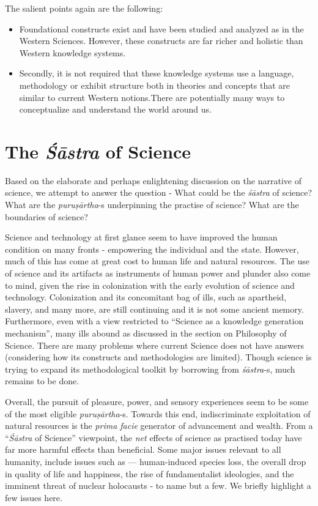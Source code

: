 The salient points again are the following:
\begin{itemize}[topsep=0pt]
\itemsep=0pt
\item Foundational constructs exist and have been studied and analyzed as in the Western Sciences. However, these constructs are far richer and holistic than Western knowledge systems.

 \item Secondly, it is not required that these knowledge systems use a language, methodology or exhibit structure both in theories and concepts that are similar to current Western notions.There are potentially many ways to conceptualize and understand the world around us.
\end{itemize}

\section*{The \textit{Śāstra} of Science}

Based on the elaborate and perhaps enlightening discussion on the narrative of science, we attempt to answer the question - What could be the \textit{śāstra} of science? What are the \textit{puruṣārtha}-s underpinning the practise of science? What are the boundaries of science?

Science and technology at first glance seem to have improved the human condition on many fronts - empowering the individual and the state. However, much of this has come at great cost to human life and natural resources. The use of science and its artifacts as instruments of human power and plunder also come to mind, given the rise in colonization with the early evolution of science and technology. Colonization and its concomitant bag of ills, such as apartheid, slavery, and many more, are still continuing and it is not some ancient memory. Furthermore, even with a view restricted to “Science as a knowledge generation mechanism”, many ills abound as discussed in the section on Philosophy of Science. There are many problems where current Science does not have answers (considering how its constructs and methodologies are limited). Though science is trying to expand its methodological toolkit by borrowing from \textit{śāstra}-s, much remains to be done.

Overall, the pursuit of pleasure, power, and sensory experiences seem to be some of the most eligible \textit{puruṣārtha}-s. Towards this end, indiscriminate exploitation of natural resources is the \textit{prima facie} generator of advancement and wealth. From a “\textit{Śāstra} of Science” viewpoint, the \textit{net} effects of science as practised today have far more harmful effects than beneficial. Some major issues relevant to all humanity, include issues such as — human-induced species loss, the overall drop in quality of life and happiness, the rise of fundamentalist ideologies, and the imminent threat of nuclear holocausts - to name but a few. We briefly highlight a few issues here.

